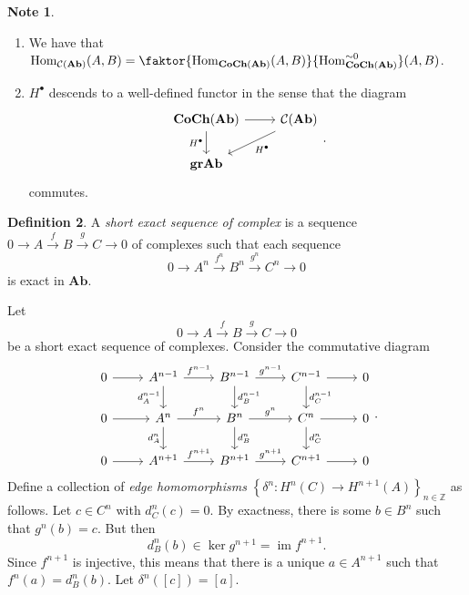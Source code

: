 \documentclass[10pt,letterpaper,cm]{nupset}
\theoremstyle{definition}
\newtheorem{definition}{Definition}[subsection]
\newtheorem{note}[definition]{Note}
\theoremstyle{theorem}
\theoremstyle{remark}
\newcommand{\Z}{\mathbb Z}
\newcommand{\1}{\mathbf{1}}
\newcommand{\0}{\vec 0}
\DeclareMathOperator{\im}{im}
\DeclareMathOperator{\Hom}{Hom}
\begin{document}
\begin{note} $ $
\begin{enumerate}
\item We have that $\Hom_{\mathcal{C}(\mathbf{Ab})}(A, B) = \faktor{\Hom_{\mathbf{CoCh(Ab)}}(A, B)}{\Hom_{\mathbf{CoCh(Ab)}}^{\sim 0}}(A, B)$.
\item $H^{\bullet}$ descends to a well-defined functor in the sense that the diagram
\[
\begin{tikzcd}
 \mathbf{CoCh(Ab)} \arrow[d, "H^{\bullet}"'] \arrow[r] &  \mathcal{C}(\mathbf{Ab}) \arrow[ld, "H^{\bullet}"] \\
\mathbf{grAb}                                          &                                  
\end{tikzcd}
. \]
commutes.
\end{enumerate}
\end{note}

\begin{definition}
A \textit{short exact sequence of complex} is a sequence $0 \to A \overset{f}{\longrightarrow} B \overset{g}{\longrightarrow} C \to 0$ of complexes such that each sequence $$0 \to A^n \overset{f^n}{\longrightarrow} B^n \overset{g^n}{\longrightarrow} C^n \to 0$$ is exact in $\mathbf{Ab}$.
\end{definition}


Let $$0 \to A \overset{f}{\longrightarrow} B \overset{g}{\longrightarrow} C \to 0$$ be a short exact sequence of complexes. Consider the commutative diagram
 \[
 \begin{tikzcd}
0 \arrow[r] & A^{n-1} \arrow[r, "f^{n-1}"] \arrow[d, "d^{n-1}_A"'] & B^{n-1} \arrow[r, "g^{n-1}"] \arrow[d, "d_B^{n-1}"] & C^{n-1} \arrow[r] \arrow[d, "d_C^{n-1}"] & 0 \\
0 \arrow[r] & A^n \arrow[r, "f^n"] \arrow[d, "d_A^n"']             & B^n \arrow[r, "g^n"] \arrow[d, "d_B^n"]             & C^n \arrow[r] \arrow[d, "d_C^n"]         & 0 \\
0 \arrow[r] & A^{n+1} \arrow[r, "f^{n+1}"]                         & B^{n+1} \arrow[r, "g^{n+1}"]                        & C^{n+1} \arrow[r]                        & 0
\end{tikzcd}
 .\]
 Define a collection of \textit{edge homomorphisms} $\left\{\delta^n : H^n(C) \to H^{n+1}(A)\right\}_{n\in \Z}$ as follows. Let $c\in C^n$ with $d_C^n(c) =0$. By exactness, there is some $b\in B^n$ such that $g^n(b) =c$. But then $$d_B^n(b) \in \ker{g^{n+1}} = \im{f^{n+1}}.$$ Since $f^{n+1}$ is injective, this means that there is a unique $a \in A^{n+1}$ such that $f^n(a) = d_B^n(b)$. Let $\delta^n([c]) = [a]$.
\end{document}

